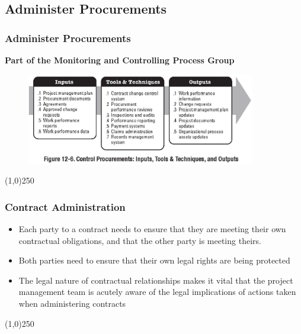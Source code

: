 \subsection{Administer Procurements}

\begin{frame}
\frametitle{Administer Procurements}
\textbf{Part of the Monitoring and Controlling Process Group}
\begin{figure}
	\centering
		\includegraphics[width = 10cm]{images/Fig12-6.jpg}
	\label{fig:12-6}
\end{figure}

\end{frame}\begin{center}\line(1,0){250}\end{center}


\begin{frame}
\frametitle{Contract Administration}
\begin{itemize}
	\item Each party to a contract needs to ensure that they are meeting their own contractual obligations, and that the other party is meeting theirs.
	\item Both parties need to ensure that their own legal rights are being protected
	\item The legal nature of contractual relationships makes it vital that the project management team is acutely aware of the legal implications of actions taken when administering contracts
\end{itemize}
\end{frame}\begin{center}\line(1,0){250}\end{center}




